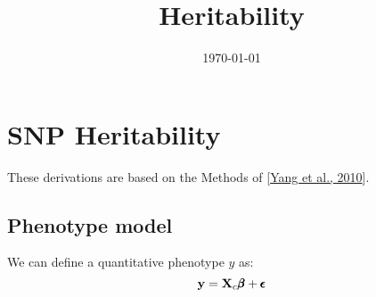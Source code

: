 \documentclass[12pt]{article}
\title{Heritability}
\date{\today}
\begin{document}
\maketitle

\section{SNP Heritability}
These derivations are based on the Methods of [\href{https://www.nature.com/articles/ng.608}{Yang et al., 2010}]. 

\subsection{Phenotype model}
We can define a quantitative phenotype $y$ as:
$$ \mathbf{y} = \mathbf{X}_c \pmb{\beta} + \pmb{\epsilon} $$
\end{document}
